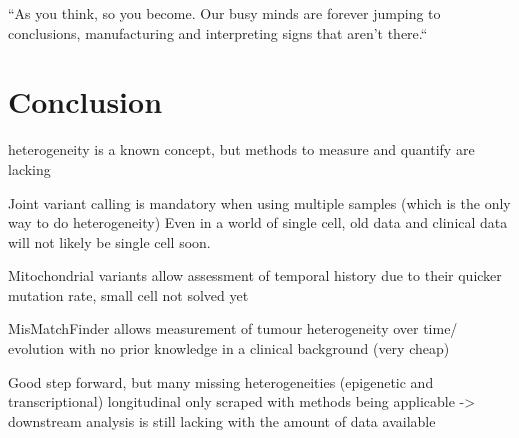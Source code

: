 
\begin{savequote}[85mm]
``As you think, so you become. Our busy minds are forever jumping to conclusions, manufacturing and interpreting signs that aren’t there.``
\end{savequote}


\chapter{Conclusion}
\label{ch:conclusion}



heterogeneity is a known concept, but methods to measure and quantify are lacking

Joint variant calling is mandatory when using multiple samples (which is the only way to do heterogeneity)
Even in a world of single cell, old data and clinical data will not likely be single cell soon.

Mitochondrial variants allow assessment of temporal history due to their quicker mutation rate, small cell not solved yet

MisMatchFinder allows measurement of tumour heterogeneity over time/ evolution with no prior knowledge in a clinical background (very cheap)

Good step forward, but many missing heterogeneities (epigenetic and transcriptional) longitudinal only scraped with methods being applicable -> downstream analysis is still lacking with the amount of data available 